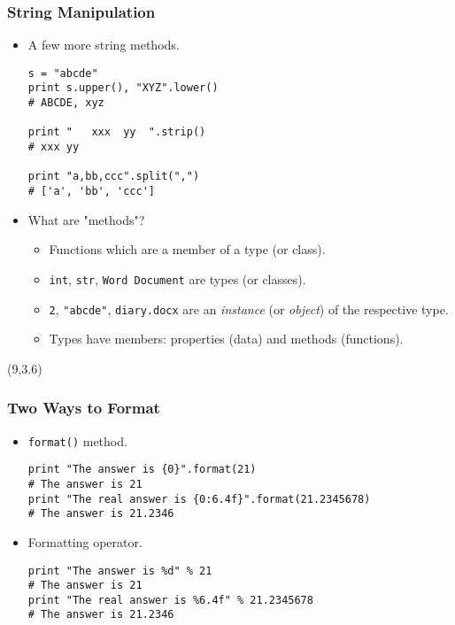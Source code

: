 \documentclass{beamer}
\begin{document}
\begin{frame}[fragile]
\frametitle{String Manipulation}
\begin{itemize}
\item<1-> A few more string methods.
\begin{lstlisting}
s = "abcde"
print s.upper(), "XYZ".lower()
# ABCDE, xyz

print "   xxx  yy  ".strip()
# xxx yy

print "a,bb,ccc".split(",")
# ['a', 'bb', 'ccc']
\end{lstlisting}
\item<2-> What are "methods"?
\begin{itemize}
\item<3-> Functions which are a member of a type (or class).
\item<4-> \lstinline{int}, \lstinline{str}, \lstinline{Word Document}
          are types (or classes).
\item<4-> \lstinline{2}, \lstinline{"abcde"}, \lstinline{diary.docx}
          are an \emph{instance} (or \emph{object}) of the
          respective type.
\item<4-> Types have members: properties (data) and methods (functions).
\end{itemize}
\end{itemize}

\begin{textblock}{5}(9,3.6)
\end{textblock}

\end{frame}

\begin{frame}[fragile]
\frametitle{Two Ways to Format}
\begin{itemize}
\item \lstinline{format()} method.
\begin{lstlisting}
print "The answer is {0}".format(21)
# The answer is 21
print "The real answer is {0:6.4f}".format(21.2345678)
# The answer is 21.2346
\end{lstlisting}
\item Formatting operator.
\begin{lstlisting}
print "The answer is %d" % 21
# The answer is 21
print "The real answer is %6.4f" % 21.2345678
# The answer is 21.2346
\end{lstlisting}
\end{itemize}
\end{frame}
\end{document}
